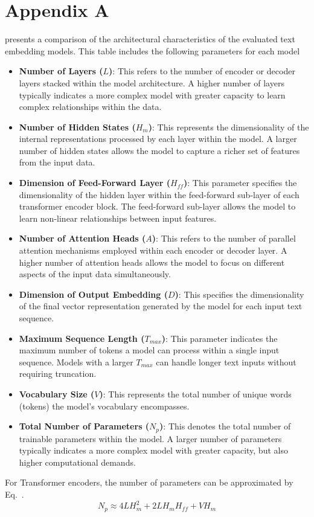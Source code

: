 
\chapter{Appendix A} \label{chap:appendix_A}

 presents a comparison of the architectural characteristics of the evaluated text embedding models.
This table includes the following parameters for each model

\begin{itemize}
    \item \textbf{Number of Layers ($L$)}:
        This refers to the number of encoder or decoder layers stacked within the model architecture.
        A higher number of layers typically indicates a more complex model with greater capacity to learn complex relationships within the data.
    \item \textbf{Number of Hidden States ($H_m$)}:
        This represents the dimensionality of the internal representations processed by each layer within the model.
        A larger number of hidden states allows the model to capture a richer set of features from the input data.
    \item \textbf{Dimension of Feed-Forward Layer ($H_{ff}$)}:
        This parameter specifies the dimensionality of the hidden layer within the feed-forward sub-layer of each transformer encoder block.
        The feed-forward sub-layer allows the model to learn non-linear relationships between input features.
    \item \textbf{Number of Attention Heads ($A$)}:
        This refers to the number of parallel attention mechanisms employed within each encoder or decoder layer.
        A higher number of attention heads allows the model to focus on different aspects of the input data simultaneously.
    \item \textbf{Dimension of Output Embedding ($D$)}:
        This specifies the dimensionality of the final vector representation generated by the model for each input text sequence.
    \item \textbf{Maximum Sequence Length ($T_{max}$)}:
        This parameter indicates the maximum number of tokens a model can process within a single input sequence.
        Models with a larger $T_{max}$ can handle longer text inputs without requiring truncation.
    \item \textbf{Vocabulary Size ($V$)}:
        This represents the total number of unique words (tokens) the model's vocabulary encompasses.
    \item \textbf{Total Number of Parameters ($N_p$)}:
        This denotes the total number of trainable parameters within the model.
        A larger number of parameters typically indicates a more complex model with greater capacity, but also higher computational demands.
\end{itemize}


For Transformer encoders, the number of parameters can be approximated by Eq.~.
\begin{equation}
    \label{eq:model_params}
    N_p \approx 4LH_m^2 + 2LH_m H_{ff} + VH_m
\end{equation}



